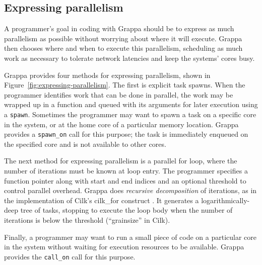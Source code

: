 \subsection{Expressing parallelism}

A programmer's goal in coding with Grappa should be to express as much
parallelism as possible without worrying about where it will execute.
Grappa then chooses where and when to execute this parallelism,
scheduling as much work as necessary to tolerate network latencies and
keep the systems' cores busy. 

Grappa provides four methods for expressing parallelism, shown in
Figure~\ref{fig:expressing-parallelism}. The first is explicit task
spawns. When the programmer identifies work that can be done in
parallel, the work may be wrapped up in a function and queued with its
arguments for later execution using a \texttt{spawn}. Sometimes the
programmer may want to spawn a task on a specific core in the system,
or at the home core of a particular memory location. Grappa provides a
\texttt{spawn\_on} call for this purpose; the task is immediately
enqueued on the specified core and is not available to other cores.

The next method for expressing parallelism is a parallel for loop,
where the number of iterations must be known at loop entry. The programmer specifies
a function pointer along with start and end indices and an optional
threshold to control parallel overhead. Grappa does {\em recursive decomposition} of iterations,
 as in the implementation of Cilk's cilk\_for construct .
It generates a logarithmically-deep tree of tasks, stopping to execute
the loop body when the number of iterations is below the threshold (``grainsize'' in Cilk).

Finally, a programmer may want to run a small piece of code on a
particular core in the system without waiting for execution resources
to be available. Grappa provides the \texttt{call\_on} call for this
purpose.


